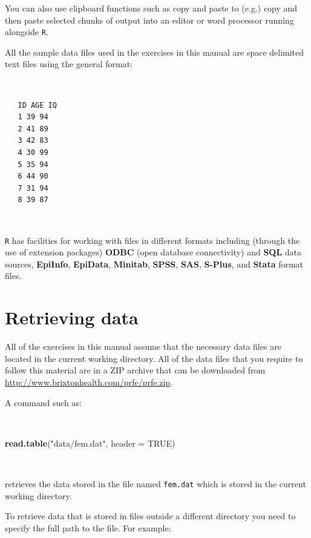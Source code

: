 \documentclass[12pt,a4paper]{book}
\newenvironment{Shaded}{\begin{snugshade}}{\end{snugshade}}
\newcommand{\KeywordTok}[1]{\textcolor[rgb]{0.13,0.29,0.53}{\textbf{#1}}}
\newcommand{\DataTypeTok}[1]{\textcolor[rgb]{0.13,0.29,0.53}{#1}}
\newcommand{\StringTok}[1]{\textcolor[rgb]{0.31,0.60,0.02}{#1}}
\newcommand{\OtherTok}[1]{\textcolor[rgb]{0.56,0.35,0.01}{#1}}
\newcommand{\NormalTok}[1]{#1}
\theoremstyle{definition}
\theoremstyle{definition}
\theoremstyle{definition}
\theoremstyle{remark}
\begin{document}
You can also use clipboard functions such as copy and paste to (e.g.)
copy and then paste selected chunks of output into an editor or word
processor running alongside \texttt{R}.

All the sample data files used in the exercises in this manual are space
delimited text files using the general format:

~

\begin{verbatim}
   ID AGE IQ
   1 39 94
   2 41 89
   3 42 83
   4 30 99
   5 35 94
   6 44 90
   7 31 94
   8 39 87
\end{verbatim}

~

\texttt{R} has facilities for working with files in different formats
including (through the use of extension packages) \textbf{ODBC} (open
database connectivity) and \textbf{SQL} data sources, \textbf{EpiInfo},
\textbf{EpiData}, \textbf{Minitab}, \textbf{SPSS}, \textbf{SAS},
\textbf{S-Plus}, and \textbf{Stata} format files.

\newpage

\hypertarget{retrieving-data}{%
\section*{Retrieving data}\label{retrieving-data}}

All of the exercises in this manual assume that the necessary data files
are located in the current working directory. All of the data files that
you require to follow this material are in a ZIP archive that can be
downloaded from \url{http://www.brixtonhealth.com/prfe/prfe.zip}.

A command such as:

~

\begin{Shaded}
\begin{Highlighting}[]
\KeywordTok{read.table}\NormalTok{(}\StringTok{"data/fem.dat"}\NormalTok{, }\DataTypeTok{header =} \OtherTok{TRUE}\NormalTok{)}
\end{Highlighting}
\end{Shaded}

~

retrieves the data stored in the file named \texttt{fem.dat} which is
stored in the current working directory.

To retrieve data that is stored in files outside a different directory
you need to specify the full path to the file. For example:
\end{document}
